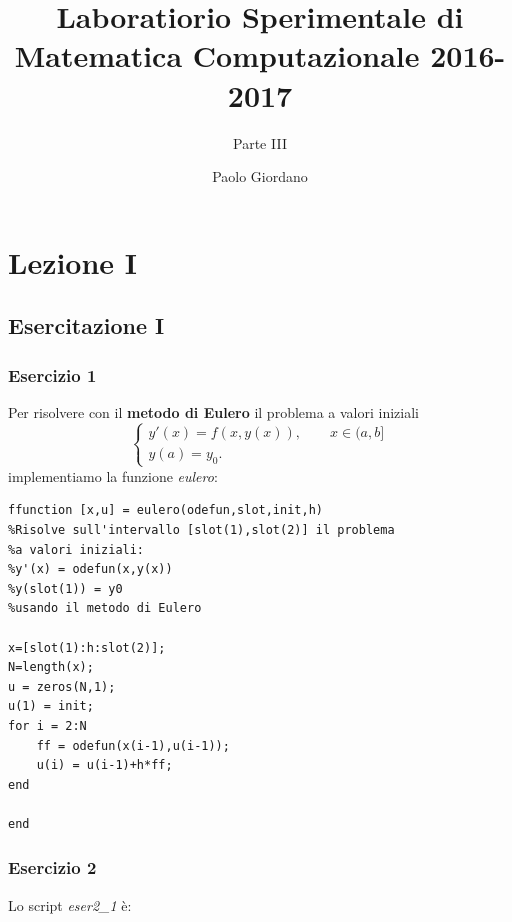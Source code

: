 \documentclass[11pt,a4paper,twoside,openright,titlepage,
headinclude,footinclude,BCOR5mm,
numbers=noenddot,cleardoublepage=empty,
tablecaptionabove]{scrbook}
\begin{document}

\frontmatter

\title{Laboratiorio Sperimentale di Matematica Computazionale 2016-2017}
\subtitle{Parte III}
\author{Paolo Giordano}
\maketitle


\tableofcontents

\mainmatter

\chapter{Lezione I}
\section{Esercitazione I}
\subsection{Esercizio 1}

Per risolvere con il \textbf{metodo di Eulero} il problema a valori iniziali
\[
\begin{cases}
y'(x)=f(x,y(x)),\qquad x\in(a,b] \\
y(a)=y_0.
\end{cases}
\]
implementiamo la funzione \emph{eulero}:

\begin{lstlisting}[frame=trBL]
ffunction [x,u] = eulero(odefun,slot,init,h)
%Risolve sull'intervallo [slot(1),slot(2)] il problema 
%a valori iniziali:
%y'(x) = odefun(x,y(x))
%y(slot(1)) = y0
%usando il metodo di Eulero

x=[slot(1):h:slot(2)];
N=length(x);
u = zeros(N,1);  
u(1) = init;
for i = 2:N
    ff = odefun(x(i-1),u(i-1));
    u(i) = u(i-1)+h*ff;
end

end

\end{lstlisting}

\subsection{Esercizio 2}
Lo script \emph{eser2\_1} è:
\end{document}
